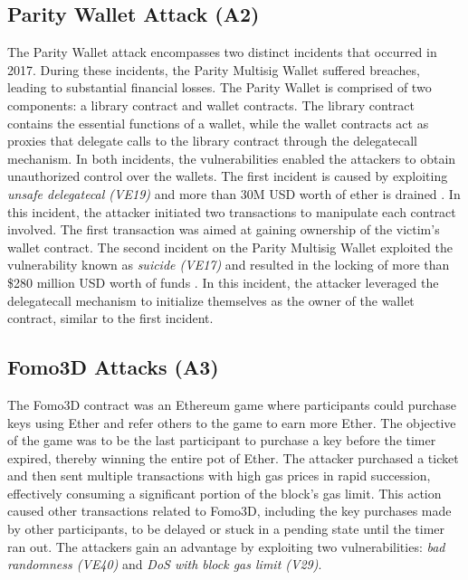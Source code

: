 \documentclass[manuscript,screen]{acmart}
\begin{document}
\subsection{Parity Wallet Attack (A2)}
The Parity Wallet attack encompasses two distinct incidents that occurred in 2017. During these incidents, the Parity Multisig Wallet suffered breaches, leading to substantial financial losses. The Parity Wallet is comprised of two components: a library contract and wallet contracts. The library contract contains the essential functions of a wallet, while the wallet contracts act as proxies that delegate calls to the library contract through the delegatecall mechanism. In both incidents, the vulnerabilities enabled the attackers to obtain unauthorized control over the wallets. The first incident is caused by exploiting \textit{unsafe delegatecal (VE19)} and more than 30M USD worth of ether is drained \cite{Palladino2017}. In this incident, the attacker initiated two transactions to manipulate each contract involved. The first transaction was aimed at gaining ownership of the victim's wallet contract.
The second incident on the Parity Multisig Wallet exploited the vulnerability known as \textit{suicide (VE17)} and resulted in the locking of more than \$280 million USD worth of funds \cite{Sergey}. In this incident, the attacker leveraged the delegatecall mechanism to initialize themselves as the owner of the wallet contract, similar to the first incident.


\subsection{Fomo3D Attacks (A3)}
The Fomo3D contract was an Ethereum game where participants could purchase keys using Ether and refer others to the game to earn more Ether. The objective of the game was to be the last participant to purchase a key before the timer expired, thereby winning the entire pot of Ether. The attacker purchased a ticket and then sent multiple transactions with high gas prices in rapid succession, effectively consuming a significant portion of the block's gas limit. This action caused other transactions related to Fomo3D, including the key purchases made by other participants, to be delayed or stuck in a pending state until the timer ran out.
The attackers gain an advantage by exploiting two vulnerabilities: \textit{bad randomness (VE40)} and \textit{DoS with block gas limit (V29)}.
\end{document}
